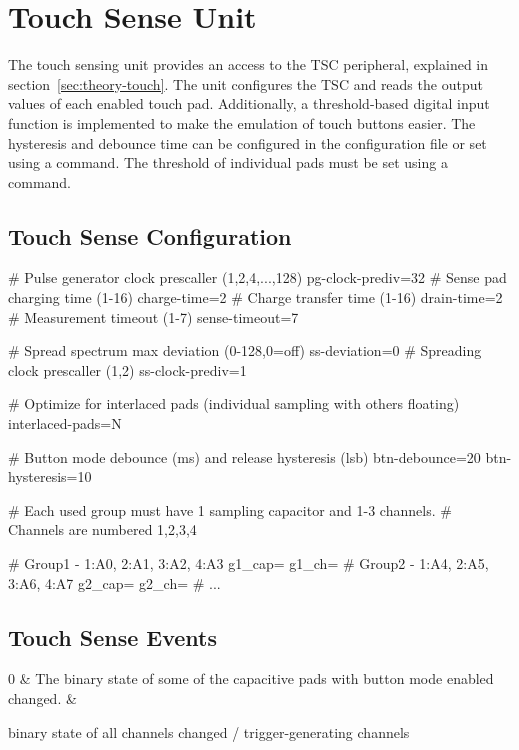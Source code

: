 \section{Touch Sense Unit}

The touch sensing unit provides an access to the \gls{TSC} peripheral, explained in section~\ref{sec:theory-touch}. The unit configures the \gls{TSC} and reads the output values of each enabled touch pad. Additionally, a threshold-based digital input function is implemented to make the emulation of touch buttons easier. The hysteresis and debounce time can be configured in the configuration file or set using a command. The threshold of individual pads must be set using a command.

\subsection{Touch Sense Configuration}

\begin{inicode}
# Pulse generator clock prescaller (1,2,4,...,128)
pg-clock-prediv=32
# Sense pad charging time (1-16)
charge-time=2
# Charge transfer time (1-16)
drain-time=2
# Measurement timeout (1-7)
sense-timeout=7

# Spread spectrum max deviation (0-128,0=off)
ss-deviation=0
# Spreading clock prescaller (1,2)
ss-clock-prediv=1

# Optimize for interlaced pads (individual sampling with others floating)
interlaced-pads=N

# Button mode debounce (ms) and release hysteresis (lsb)
btn-debounce=20
btn-hysteresis=10

# Each used group must have 1 sampling capacitor and 1-3 channels.
# Channels are numbered 1,2,3,4

# Group1 - 1:A0, 2:A1, 3:A2, 4:A3
g1_cap=
g1_ch=
# Group2 - 1:A4, 2:A5, 3:A6, 4:A7
g2_cap=
g2_ch=
# ...
\end{inicode}


\subsection{Touch Sense Events}

\begin{cmdlist}
    0 & 
    The binary state of some of the capacitive pads with button mode enabled changed.
    & \begin{cmdpld}
         binary state of all channels
         changed / trigger-generating channels
    \end{cmdpld} \\
\end{cmdlist}

